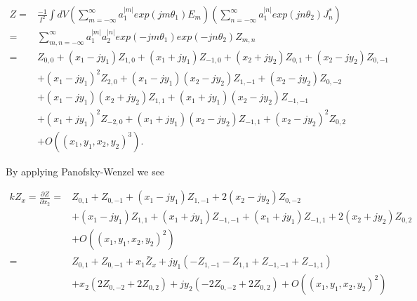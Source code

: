 \begin{align}
Z = &\frac{-1}{I^{2}} \int dV \left( \displaystyle\sum\limits^{\infty}_{m=-\infty} a_{1}^{|m|} exp \left( jm\theta_{1} \right) E_{m}\right) \left( \displaystyle\sum\limits^{\infty}_{n=-\infty} a_{1}^{|n|} exp \left( jn\theta_{2} \right) J^{*}_{n}\right) \nonumber \\
   = &\displaystyle\sum\limits^{\infty}_{m,n=-\infty} a_{1}^{|m|} a_{2}^{|n|} exp\left( -jm\theta_{1} \right) exp\left( -jn\theta_{2} \right) Z_{m,n} \nonumber \\
   = &Z_{0,0} + \left( x_{1}- jy_{1} \right)Z_{1,0} + \left( x_{1} + jy_{1} \right)Z_{-1,0} + \left( x_{2} + jy_{2} \right)Z_{0,1} +  \left( x_{2} - jy_{2} \right)Z_{0,-1} \nonumber \\
      & +\left( x_{1} - jy_{1} \right)^{2}Z_{2,0} +  \left( x_{1} - jy_{1} \right)\left( x_{2} - jy_{2} \right)Z_{1,-1} + \left( x_{2} - jy_{2} \right) Z_{0,-2} \nonumber \\
      & +\left( x_{1} - jy_{1} \right)\left( x_{2} + jy_{2} \right)Z_{1,1} + \left( x_{1} + jy_{1} \right) \left( x_{2} - jy_{2} \right) Z_{-1,-1} \nonumber \\
      & +\left( x_{1} + jy_{1} \right)^{2}Z_{-2,0} + \left( x_{1} + jy_{1} \right)\left( x_{2} - jy_{2} \right) Z_{-1,1} + \left( x_{2} - jy_{2} \right)^{2}Z_{0,2} \nonumber \\
      & +O\left( \left(  x_{1},y_{1},x_{2},y_{2} \right)^{3} \right).
\label{eqn:gen_imp}
\end{align}

By applying Panofsky-Wenzel we see

\begin{align}
kZ_{x} =\frac{\partial Z}{\partial x_{2}} = & Z_{0,1} + Z_{0,-1} + \left( x_{1} - jy_{1} \right) Z_{1,-1} + 2\left( x_{2} - jy_{2} \right) Z_{0,-2} \nonumber \\
						&+ \left( x_{1} - jy_{1} \right) Z_{1,1} + \left( x_{1} + jy_{1} \right) Z_{-1,-1} + \left( x_{1} + jy_{1} \right) Z_{-1,1} + 2\left( x_{2} + jy_{2} \right) Z_{0,2} \nonumber \\
						& + O\left( \left( x_{1},y_{1},x_{2},y_{2} \right)^{2} \right) \nonumber \\
						= & Z_{0,1} + Z_{0,-1} + x_{1}\bar{Z}_{x} + jy_{1} \left( -Z_{1,-1} - Z_{1,1} + Z_{-1,-1} + Z_{-1,1} \right) \nonumber \\
						& + x_{2}\left( 2Z_{0,-2} + 2Z_{0,2}  \right) + jy_{2}\left( -2Z_{0,-2} + 2Z_{0,2}  \right) +  O\left( \left( x_{1},y_{1},x_{2},y_{2} \right)^{2} \right)
\end{align}

